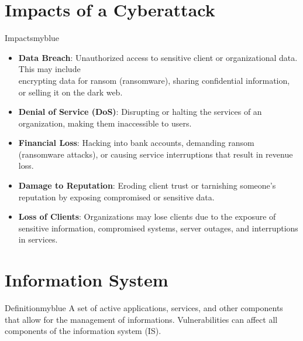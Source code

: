 \section{Impacts of a Cyberattack}
\begin{prettyBox}{Impacts}{myblue}
\begin{itemize}
    \item \textbf{Data Breach}: Unauthorized access to sensitive client or organizational data. This may include\\ encrypting data for ransom (ransomware), sharing confidential information, or selling it on the dark web.  
    \item \textbf{Denial of Service (DoS)}: Disrupting or halting the services of an organization, making them inaccessible to users.   
    \item \textbf{Financial Loss}: Hacking into bank accounts, demanding ransom (ransomware attacks), or causing service interruptions that result in revenue loss.  
    \item \textbf{Damage to Reputation}: Eroding client trust or tarnishing someone's reputation by exposing compromised or sensitive data.  
    \item \textbf{Loss of Clients}: Organizations may lose clients due to the exposure of sensitive information, compromised systems, server outages, and interruptions in services.  
\end{itemize}
\end{prettyBox}

\newpage

\section{Information System}
\begin{prettyBox}{Definition}{myblue}
A set of active applications, services, and other components that allow for the management of informations.
Vulnerabilities can affect all components of the information system (IS).  
\end{prettyBox}

